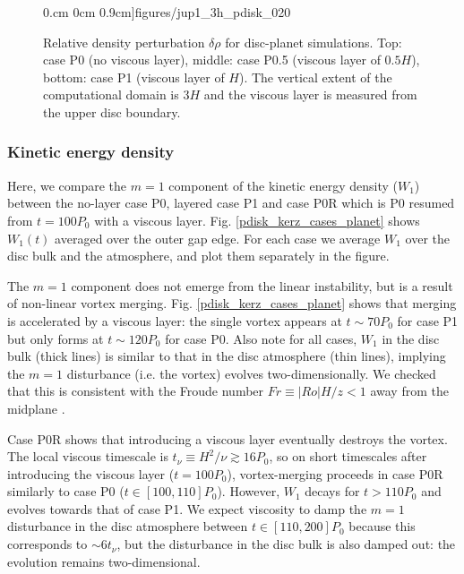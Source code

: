 \begin{figure}
    0.cm 0cm 0.9cm]{figures/jup1_3h_pdisk_020}\\
  \caption{Relative density perturbation $\delta\rho$ for disc-planet
    simulations. Top: case P0 (no viscous layer), middle: case P0.5
    (viscous layer of $0.5H$), bottom: case P1 (viscous layer of $H$). The
    vertical extent of the computational domain is $3H$ and the
    viscous layer is measured from the upper disc boundary.  
    \label{jup0_3h}}
\end{figure}

\subsubsection{Kinetic energy density}%
Here, we compare the $m=1$ component of the kinetic energy density
($W_1$)  between the no-layer case P0, layered
case P1 and case P0R which is P0 resumed from $t=100P_0$ with a
viscous layer. Fig. \ref{pdisk_kerz_cases_planet} shows 
$W_1(t)$ averaged over the outer gap edge. For each case we
average $W_1$ over the disc bulk and the atmosphere, and plot them
separately in the figure. 

The $m=1$ component does not emerge from the linear instability, but is a
result of non-linear vortex merging. 
Fig. \ref{pdisk_kerz_cases_planet} shows that merging is accelerated
by a viscous layer: the single vortex appears at $t\sim70P_0$ for case
P1 but only forms at $t\sim120P_0$ for case P0. Also note for all
cases, $W_1$ in the disc bulk (thick lines) is similar to that in the
disc atmosphere (thin lines), implying the $m=1$ disturbance
(i.e. the vortex) evolves two-dimensionally. We checked that this is
consistent with the Froude number $Fr\equiv|Ro|H/z < 1 $ away from the
midplane \citep{barranco05,oishi09}. 


Case P0R shows that introducing a viscous layer eventually destroys
the vortex. The local viscous timescale is $t_\nu\equiv
H^2/\nu\gtrsim 16P_0$, so on short timescales after introducing the 
viscous layer ($t=100P_0$), vortex-merging proceeds in case P0R
similarly to case P0 ($t\in[100,110]P_0$). However, $W_1$ decays for
$t>110P_0$ and evolves towards that of case P1. We expect viscosity
to damp the $m=1$ disturbance in the disc atmosphere between
$t\in[110,200]P_0$ because this corresponds to $\sim 6 t_\nu$, but 
the disturbance in the disc bulk is also damped out: the evolution
remains two-dimensional.    

